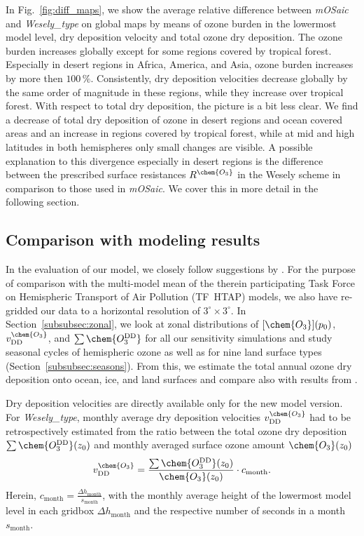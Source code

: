 \documentclass[gmd, manuscript]{copernicus}
\begin{document}
%
In Fig.~\ref{fig:diff_maps}, we show the average relative difference between \emph{mOSaic} and \emph{Wesely\_type} on global maps by means of ozone burden in the lowermost model level, dry deposition velocity and total ozone dry deposition. The ozone burden increases globally except for some regions covered by tropical forest. Especially in desert regions in Africa, America, and Asia, ozone burden increases by more then $100\,\unit{\%}$. Consistently, dry deposition velocities decrease globally by the same order of magnitude in these regions, while they increase over tropical forest. With respect to total dry deposition, the picture is a bit less clear. We find a decrease of total dry deposition of ozone in desert regions and ocean covered areas and an increase in regions covered by tropical forest, while at mid and high latitudes in both hemispheres only small changes are visible. A possible explanation to this divergence especially in desert regions is the difference between the prescribed surface resistances $R^\chem{O_3}$ in the Wesely scheme in comparison to those used in \emph{mOSaic}. We cover this in more detail in the following section.

\subsection{Comparison with modeling results}
\label{subsec:model}
%
In the evaluation of our model, we closely follow suggestions by \citet{ACP:Hardacre2015}. For the purpose of comparison with the multi-model mean of the therein participating Task Force on Hemispheric Transport of Air Pollution (TF~HTAP) models, we also have re-gridded our data to a horizontal resolution of $3^\circ\times 3^\circ$. In Section~\ref{subsubsec:zonal}, we look at zonal distributions of $[\chem{O_3}](p_0)$, $v^\chem{O_3}_\text{DD}$, and $\sum\chem{O_3^\text{DD}}$ for all our sensitivity simulations and study seasonal cycles of hemispheric ozone as well as for nine land surface types (Section~\ref{subsubsec:seasons}). From this, we estimate the total annual ozone dry deposition onto ocean, ice, and land surfaces and compare also with results from \citet{ACP:Luhar2017}.

Dry deposition velocities are directly available only for the new model version. For \emph{Wesely\_type}, monthly average dry deposition velocities $v^\chem{O_3}_\text{DD}$ had to be retrospectively estimated from the ratio between the total ozone dry deposition $\sum \chem{O_3^\text{DD}}(z_0)$ and monthly averaged surface ozone amount $\chem{O_3}(z_0)$ 
\begin{equation}
  v^\chem{O_3}_\text{DD} = \frac{\sum \chem{O_3^\text{DD}}(z_0)}{\chem{O_3}(z_0)}\cdot c_\text{month}.
\end{equation}
Herein, $c_\text{month} = \frac{\Delta h_\text{month}}{s_\text{month}}$, with the monthly average height of the lowermost model level in each gridbox $\Delta h_\text{month}$ and the respective number of seconds in a month $s_\text{month}$. 
%
\end{document}
